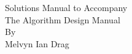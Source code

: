\begin{titlepage}
\begin{center}
Solutions Manual to Accompany\\[1cm]
The Algorithm Design Manual\\
By\\
Melvyn Ian Drag
\end{center}
\end{titlepage}
